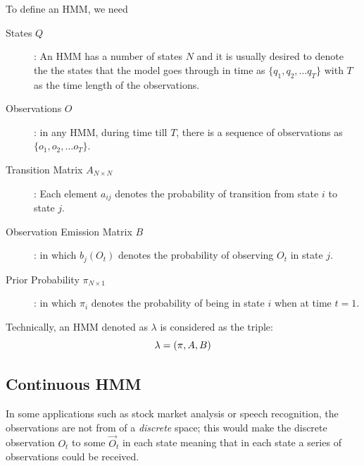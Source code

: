 \documentclass{acm_proc_article-sp}
\begin{document}
To define an HMM, we need
\begin{description}
\item[States $Q$]: An HMM has a number of states $N$ and it is usually desired to denote the the states that the model
goes through in time as $\{q_1, q_2, \ldots q_T\}$ with $T$ as the time length of the observations.
\item[Observations $O$]: in any HMM, during time till $T$, there is a sequence of observations as $\{o_1, o_2, \ldots
o_T\}$.
\item[Transition Matrix $A_{N \times N}$]: Each element $a_{ij}$ denotes the probability of transition from state $i$
to state $j$.
\item[Observation Emission Matrix $B$]: in which $b_j(O_t)$ denotes the probability of observing $O_t$ in
state $j$.
\item[Prior Probability $\pi_{N \times 1}$]: in which $\pi_i$ denotes the probability of being in state $i$ when at
time $t = 1$.
\end{description}
Technically, an HMM denoted as $\lambda$ is considered as the triple:
\begin{equation}
\boldmath{\lambda = (\pi, A, B)}
\end{equation} 

\subsection{Continuous HMM}
In some applications such as stock market analysis or speech recognition, the observations are not from of a
\textit{discrete} space; this would make the discrete observation $O_t$ to some $\vec{O}_t$ in each state meaning that
in each state a series of observations could be received.
\end{document}
